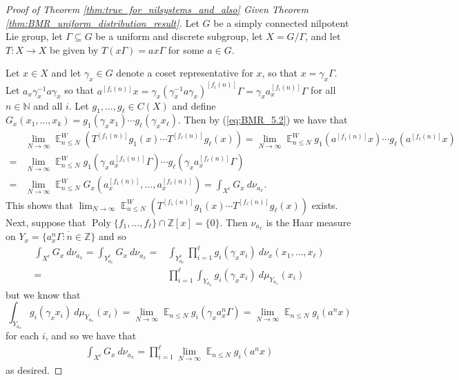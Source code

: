 \documentclass[12pt]{article}
\theoremstyle{plain} %
\theoremstyle{definition} %
\theoremstyle{plain}
\theoremstyle{plain}
\numberwithin{equation}{section}
\newcommand{\N}{\mathbb{N}}
\newcommand{\Z}{\mathbb{Z}}
\renewcommand{\leq}{\leqslant}
\renewcommand{\subset}{\subseteq}
\newcommand{\1}{\mathbbm{1}}
\newcommand{\E}{\operatorname{\mathbb{E}}}
\newcommand{\Poly}{\operatorname{Poly}}
\newcommand{\oo}{\infty}
\newcommand{\round}[1]{[ #1 ]}
\begin{document}
\begin{proof}[Proof of Theorem \ref{thm:true_for_nilsystems_and_also} Given Theorem \ref{thm:BMR_uniform_distribution_result}]

Let $G$ be a simply connected nilpotent Lie group, let
$\Gamma \subset G$ be a uniform and discrete subgroup, let
$X = G/\Gamma$, and let $T:X\rightarrow X$ be given by $T(x\Gamma) =  ax\Gamma$ for some $a \in G$.



Let $x\in X$ and let $\gamma_x\in G$ denote a coset representative for $x$, so that $x=\gamma_x\Gamma$. Let $a_x \gamma_x^{-1}a\gamma_x$ so that $a^{\round{f_i(n)}}x = \gamma_x(\gamma_x^{-1}a\gamma_x)^{\round{f_i(n)}}\Gamma = \gamma_x a_x^{\round{f_i(n)}}\Gamma$ for all $n\in \N$ and all $i$. Let $g_1,\dots, g_{\ell}\in C(X)$ and define $G_{x}(x_1,\dots, x_k) = g_1(\gamma_xx_1)\cdots g_{\ell}(\gamma_xx_{\ell})$. Then by (\ref{eq:BMR_5.2}) we have that
 \begin{align*}
             &\lim_{N\to\oo}\E_{n\leq N}^W(T^{\round{f_1(n)}}g_1(x)\cdots T^{\round{f_{\ell}(n)}}g_{\ell}(x)) = \lim_{N\to\oo}\E_{n\leq N}^Wg_1(a^{\round{f_1(n)}}x)\cdots g_{\ell}(a^{\round{f_{\ell}(n)}}x)\\
             =&\lim_{N\to\oo}\E_{n\leq N}^Wg_1(\gamma_x a_x^{\round{f_1(n)}}\Gamma)\cdots g_{\ell}(\gamma_x a_x^{\round{f_{\ell}(n)}}\Gamma)\\
             =& \lim_{N\to\oo}\E_{n\leq N}^WG_x(a_x^{\round{f_1(n)}},\dots, a_x^{\round{f_{\ell}(n)}}) = \int_{X^{\ell}} G_x ~d\nu_{a_x}.
\end{align*}
This shows that $\lim_{N\to\oo}\E_{n\leq N}^W(T^{\round{f_1(n)}}g_1(x)\cdots T^{\round{f_{\ell}(n)}}g_{\ell}(x))$ exists. Next, suppose that $\Poly\{f_1,\dots, f_{\ell}\}\cap \Z[x]=\{0\}$. Then $\nu_{a_x}$ is the Haar measure on $Y_x = \overline{\{a_x^n\Gamma:n\in \Z\}}$ and so  
\begin{align*}
    \int_{X^{\ell}} G_x ~d\nu_{a_x} = \int_{Y_{a_x}^{\ell}} G_x ~d\nu_{a_x}=&\int_{Y_{a_x}^{\ell}} \prod_{i=1}^{\ell}g_i(\gamma_x x_i)~d\nu_x(x_1,\dots, x_{\ell}) \\=&\prod_{i=1}^{\ell} \int_{Y_{a_x}} g_i(\gamma_x x_i)~d\mu_{Y_{a_x}}(x_i)
\end{align*}
    but we know that 
    \[
    \int_{Y_{a_x}} g_i(\gamma_x x_i)~d\mu_{Y_{a_x}}(x_i)=\lim_{N\to\oo}\E_{n\leq N}g_i(\gamma_xa_x^n\Gamma) =  \lim_{N\to\oo}\E_{n\leq N}g_i(a^nx)
    \]
    for each $i$, and so we have that
    \begin{align*}
    \int_{X^{\ell}} G_x ~d\nu_{a_x} = \prod_{i=1}^{\ell}\lim_{N\to\oo}\E_{n\leq N}g_i(a^nx)
\end{align*}
as desired. 



\end{proof}
\end{document}
